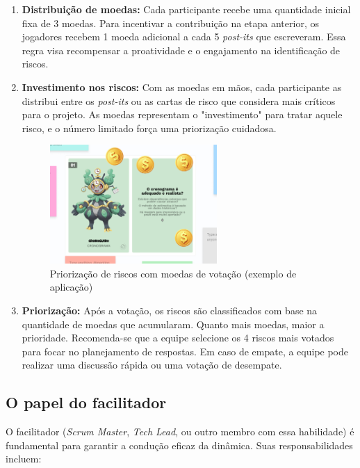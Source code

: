 \documentclass[
	12pt,
	openright,
	twoside,
	a4paper,
	english,
	brazil
	]{abntex2}
\begin{document}
\begin{enumerate}
  \item \textbf{Distribuição de moedas:} Cada participante recebe uma quantidade inicial fixa de 3 moedas. Para incentivar a contribuição na etapa anterior, os jogadores recebem 1 moeda adicional a cada 5 \textit{post-its} que escreveram. Essa regra visa recompensar a proatividade e o engajamento na identificação de riscos.
  \item \textbf{Investimento nos riscos:} Com as moedas em mãos, cada participante as distribui entre os \textit{post-its} ou as cartas de risco que considera mais críticos para o projeto. As moedas representam o "investimento" para tratar aquele risco, e o número limitado força uma priorização cuidadosa.
  \begin{figure}[H]
      \centering
      \caption{\label{votacao-moedas} Priorização de riscos com moedas de votação (exemplo de aplicação)}
      \includegraphics[width=0.6\textwidth]{votacao-moedas}
  \end{figure}

  \item \textbf{Priorização:} Após a votação, os riscos são classificados com base na quantidade de moedas que acumularam. Quanto mais moedas, maior a prioridade. Recomenda-se que a equipe selecione os 4 riscos mais votados para focar no planejamento de respostas. Em caso de empate, a equipe pode realizar uma discussão rápida ou uma votação de desempate.
\end{enumerate}

\subsection{O papel do facilitador}

O facilitador (\textit{Scrum Master}, \textit{Tech Lead}, ou outro membro com essa habilidade) é fundamental para garantir a condução eficaz da dinâmica. Suas responsabilidades incluem:
\end{document}

